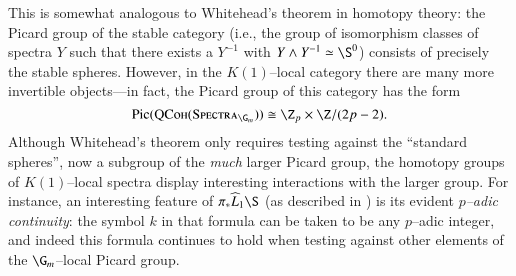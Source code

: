 This is somewhat analogous to Whitehead's theorem in homotopy theory: the Picard group of the stable category (i.e., the group of isomorphism classes of spectra $Y$ such that there exists a $Y^{-1}$ with $Y \sm Y^{-1} \simeq \S^0$) consists of precisely the stable spheres.  However, in the $K(1)$--local category there are many more invertible objects---in fact, the Picard group of this category has the form \[\operatorname{Pic}(\CatOf{QCoh}(\CatOf{Spectra}_{\G_m})) \cong \Z_p \times \Z / (2p-2).\]  Although Whitehead's theorem only requires testing against the ``standard spheres'', now a subgroup of the \emph{much} larger Picard group, the homotopy groups of $K(1)$--local spectra display interesting interactions with the larger group.  For instance, an interesting feature of $\pi_* \widehat L_1 \S$ (as described in ) is its evident \emph{$p$--adic continuity}: the symbol $k$ in that formula can be taken to be any $p$--adic integer, and indeed this formula continues to hold when testing against other elements of the $\G_m$--local Picard group.

